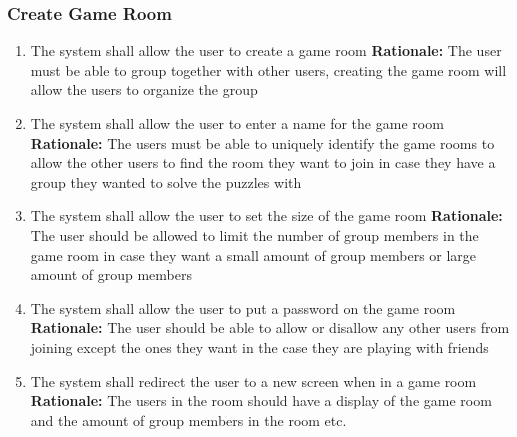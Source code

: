 \documentclass[12pt]{article}
\begin{document}
\subsubsection{Create Game Room}
\begin{enumerate}[label=CG\arabic*., series=CreateGame]
    \item The system shall allow the user to create a game room \newline 
    \textbf{Rationale:} The user must be able to group together with other users, creating the game room will allow the users to organize the group
    \item The system shall allow the user to enter a name for the game room \newline
    \textbf{Rationale:} The users must be able to uniquely identify the game rooms to allow the other users to find the room they want to join in case they have a group they wanted to solve the puzzles with
    \item The system shall allow the user to set the size of the game room \newline
    \textbf{Rationale:} The user should be allowed to limit the number of group members in the game room in case they want a small amount of group members or large amount of group members
    \item The system shall allow the user to put a password on the game room \newline
    \textbf{Rationale:} The user should be able to allow or disallow any other users from joining except the ones they want in the case they are playing with friends
    \item The system shall redirect the user to a new screen when in a game room \newline
    \textbf{Rationale: } The users in the room should have a display of the game room and the amount of group members in the room etc. 
\end{enumerate}
\end{document}

